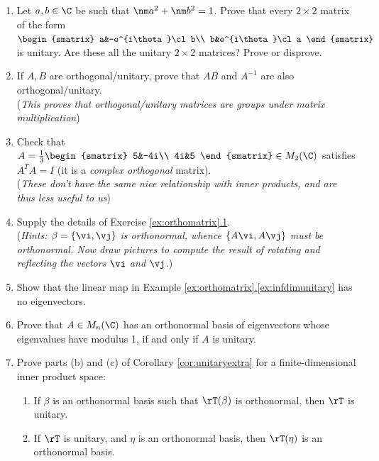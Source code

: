 \begin{exercises}
\begin{enumerate}
	\item Let $a,b\in\C$ be such that $\nm a^2+\nm b^2=1$. Prove that every $2\times 2$ matrix of the form $\begin{smatrix}
	a&-e^{i\theta}\cl b\\
	b&e^{i\theta}\cl a
	\end{smatrix}$ is unitary. Are these all the unitary $2\times 2$ matrices? Prove or disprove.
	
	
	\item If $A,B$ are orthogonal/unitary, prove that $AB$ and $A^{-1}$ are also orthogonal/unitary.\\[2pt]
	(\emph{This proves that orthogonal/unitary matrices are groups under matrix multiplication})
  
  \item\label{ex:comporth} Check that $A=\frac 13\begin{smatrix}
	5&-4i\\
	4i&5
  \end{smatrix}\in M_2(\C)$ satisfies $A^TA=I$ (it is a \emph{complex orthogonal} matrix).\\[2pt]
  (\emph{These don't have the same nice relationship with inner products, and are thus less useful to us}) 
  
  \item\label{ex:rotrefmatrix} Supply the details of Exercise \hyperref[ex:orthomatrix]{\ref*{ex:orthomatrix}.1}.\\[2pt]
  (\emph{Hints: $\beta=\{\vi,\vj\}$ is orthonormal, whence $\{A\vi,A\vj\}$ must be orthonormal. Now draw pictures to compute the result of rotating and reflecting the vectors $\vi$ and $\vj$.})
  
	
	\item Show that the linear map in Example \hyperref[ex:infdimunitary]{\ref*{ex:orthomatrix}.\ref*{ex:infdimunitary}} has no eigenvectors.
	
  
  \item\label{ex:unitarymatrix} Prove that $A\in M_n(\C)$ has an orthonormal basis of eigenvectors whose eigenvalues have modulus 1, if and only if $A$ is unitary.
  
  
  \item\label{ex:orthbasis} Prove parts (b) and (c) of Corollary \ref{cor:unitaryextra} for a finite-dimensional inner product space:
  \begin{enumerate}
    \item If $\beta$ is an orthonormal basis such that $\rT(\beta)$ is orthonormal, then $\rT$ is unitary.
    \item If $\rT$ is unitary, and $\eta$ is an orthonormal basis, then $\rT(\eta)$ is an orthonormal basis.
  \end{enumerate}
  

\end{enumerate}
\end{exercises}
